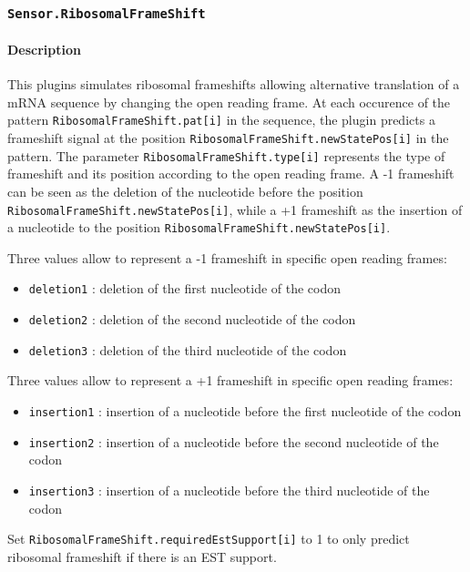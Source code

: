 
\subsubsection{\texttt{Sensor.RibosomalFrameShift}}

\paragraph{Description}

This plugins simulates ribosomal frameshifts allowing alternative translation of a mRNA sequence 
by changing the open reading frame. At each occurence of the pattern \texttt{RibosomalFrameShift\-.pat[i]} in the sequence, 
the plugin predicts a frameshift signal at the position \texttt{RibosomalFrameShi\-ft.newStatePos[i]} in the pattern.
The parameter \texttt{RibosomalFrameShift.type[i]} represents the type of frameshift and its position according to the open 
reading frame. A -1 frameshift can be seen as the deletion of the nucleotide before the position 
\texttt{RibosomalFrameShift.newStatePos[i]}, while a +1 frameshift as the insertion of a nucleotide to the position \texttt{RibosomalFrameShift.newStatePos[i]}.

Three values allow to represent a -1 frameshift in specific open reading frames:
\begin{itemize}
\item \texttt{deletion1} : deletion of the first nucleotide of the codon
\item \texttt{deletion2} : deletion of the second nucleotide of the codon
\item \texttt{deletion3} : deletion of the third nucleotide of the codon
\end{itemize}

Three values allow to represent a +1 frameshift in specific open reading frames:
\begin{itemize}
\item \texttt{insertion1} : insertion of a nucleotide before the first nucleotide of the codon
\item \texttt{insertion2} : insertion of a nucleotide before the second nucleotide of the codon
\item \texttt{insertion3} : insertion of a nucleotide before the third nucleotide of the codon
\end{itemize}

Set \texttt{RibosomalFrameShift.requiredEstSupport[i]} to 1 to only predict ribosomal frameshift if there is an EST support.

